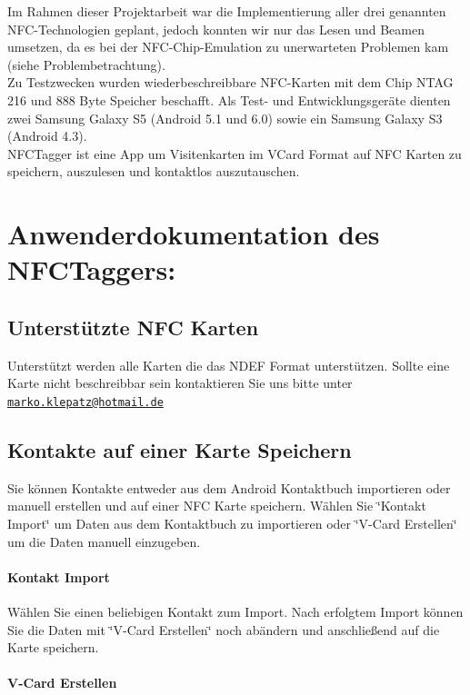 \documentclass[a4paper,ngerman,12pt]{scrreprt}
\newcommand{\+}{\discretionary{\mbox{\scriptsize$\hookleftarrow$}}{}{}}
\begin{document}
Im Rahmen dieser Projektarbeit war die Implementierung aller drei genannten N\+F\+C-\/\+Technologien geplant, jedoch konnten wir nur das Lesen und Beamen umsetzen, da es bei der NFC-Chip-Emulation zu unerwarteten Problemen kam (siehe Problembetrachtung).\\ 
Zu Testzwecken wurden wiederbeschreibbare N\+F\+C-\/\+Karten mit dem Chip N\+T\+AG 216 und 888 Byte Speicher beschafft. Als Test-\/ und Entwicklungsgeräte dienten zwei Samsung Galaxy S5 (Android 5.\+1 und 6.\+0) sowie ein Samsung Galaxy S3 (Android 4.\+3). \\
N\+F\+C\+Tagger ist eine App um Visitenkarten im V\+Card Format auf N\+FC Karten zu speichern, auszulesen und kontaktlos auszutauschen.

\chapter{Anwenderdokumentation des N\+F\+C\+Taggers\+:}
\section{Unterstützte N\+FC Karten}

Unterstützt werden alle Karten die das N\+D\+EF Format unterstützen. Sollte eine Karte nicht beschreibbar sein kontaktieren Sie uns bitte unter \href{mailto:marko.klepatz@hotmail.de}{\tt marko.\+klepatz@hotmail.\+de}

\section{Kontakte auf einer Karte Speichern}

Sie können Kontakte entweder aus dem Android Kontaktbuch importieren oder manuell erstellen und auf einer N\+FC Karte speichern. Wählen Sie \char`\"{}\+Kontakt Import\char`\"{} um Daten aus dem Kontaktbuch zu importieren oder \char`\"{}\+V-\/\+Card Erstellen\char`\"{} um die Daten manuell einzugeben.

\subsubsection{Kontakt Import}

Wählen Sie einen beliebigen Kontakt zum Import. Nach erfolgtem Import können Sie die Daten mit \char`\"{}\+V-\/\+Card Erstellen\char`\"{} noch abändern und anschließend auf die Karte speichern.

\subsubsection{V-\/\+Card Erstellen}
\end{document}
